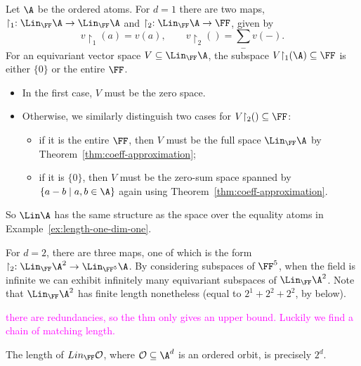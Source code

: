 \begin{myexample}
    Let $\A$ be the ordered atoms. 
    For $d = 1$ there are two maps, $\restriction_{1} : \Lin_\FF \A \to \Lin_\FF \A$ and $\restriction_{2} : \Lin_\FF \A \to \FF$, given by  
    \[
        v {\restriction_1} (a) = v(a), \qquad
        v {\restriction_2} () = \sum_{-} v(-).
    \]
    For an equivariant vector space $V \subseteq \Lin_\FF \A$, the subspace $V {\restriction_1}(\A) \subseteq \FF$ is either $\{0\}$ or the entire $\FF$.
    \begin{itemize}
        \item In the first case, $V$ must be the zero space.
        \item Otherwise, we similarly distinguish two cases for $V {\restriction_2}() \subseteq \FF$:
        \begin{itemize}
            \item if it is the entire $\FF$, then $V$ must be the full space $\Lin_\FF \A$ by Theorem~\ref{thm:coeff-approximation};
            \item if it is $\{0\}$, then $V$ must be the zero-sum space spanned by $\{a - b \mid a, b \in \A\}$ again using Theorem~\ref{thm:coeff-approximation}.
        \end{itemize}
    \end{itemize}
    So $\Lin \A$ has the same structure as the space over the equality atoms in Example~\ref{ex:length-one-dim-one}.

    For $d = 2$, there are three maps, one of which is the form $\restriction_2 : \Lin_\FF \A^2 \to \Lin_{\FF^5} \A$. 
    By considering subspaces of $\FF^5$, when the field is infinite we can exhibit infinitely many equivariant subspaces of $\Lin_\FF \A^2$.
    Note that $\Lin_\FF \A^2$ has finite length nonetheless (equal to $2^1 + 2^2 + 2^2$, by below).
\end{myexample}

\textcolor{magenta}{there are redundancies, so the thm only gives an upper bound. Luckily we find a chain of matching length.}

\begin{corollary}\label{cor:2d-length}
    The length of $Lin_\FF \cal O$, where $\cal O \subseteq \A^d$ is an ordered orbit, is precisely $2^d$.
\end{corollary}

